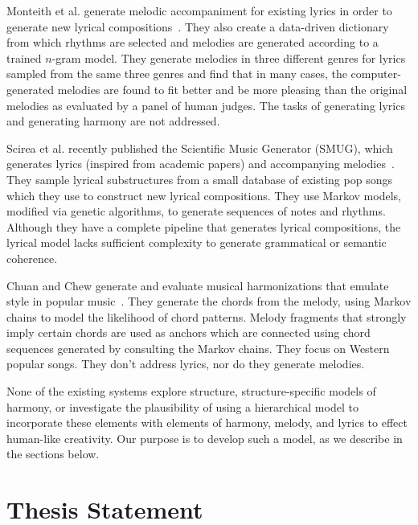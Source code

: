 \documentclass[11pt,phd]{byuprop}
\begin{document}
Monteith et al. generate melodic accompaniment for existing lyrics in order to generate new lyrical compositions~\cite{monteith2012automatic}. They also create a data-driven dictionary from which rhythms are selected and melodies are generated according to a trained $n$-gram model. They generate melodies in three different genres for lyrics sampled from the same three genres and find that in many cases, the computer-generated melodies are found to fit better and be more pleasing than the original melodies as evaluated by a panel of human judges. The tasks of generating lyrics and generating harmony are not addressed.

Scirea et al. recently published the Scientific Music Generator (SMUG), which generates lyrics (inspired from academic papers) and accompanying melodies~\cite{scirea2015smug}. They sample lyrical substructures from a small database of existing pop songs which they use to construct new lyrical compositions. They use Markov models, modified via genetic algorithms, to generate sequences of notes and rhythms. Although they have a complete pipeline that generates lyrical compositions, the lyrical model lacks sufficient complexity to generate grammatical or semantic coherence.

Chuan and Chew generate and evaluate musical harmonizations that emulate style in popular music~\cite{chuan2011generating}. They generate the chords from the melody, using Markov chains to model the likelihood of chord patterns. Melody fragments that strongly imply certain chords are used as anchors which are connected using chord sequences generated by consulting the Markov chains. They focus on Western popular songs. They don't address lyrics, nor do they generate melodies.

None of the existing systems explore structure, structure-specific models of harmony, or investigate the plausibility of using a hierarchical model to incorporate these elements with elements of harmony, melody, and lyrics to effect human-like creativity. Our purpose is to develop such a model, as we describe in the sections below.

\section{Thesis Statement}
\end{document}
